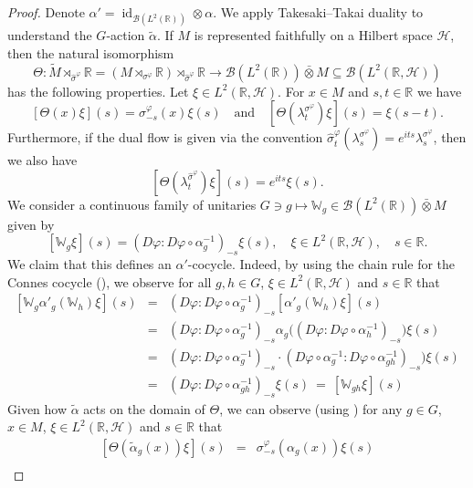 \documentclass[11pt,a4paper]{article}
\theoremstyle{definition}
\theoremstyle{remark}
\numberwithin{equation}{section}
\numberwithin{theorem}{section}
\newcommand{\R}{\mathbb{R}}
\renewcommand{\tilde}{\widetilde}
\begin{document}
\begin{proof}
Denote $\alpha'=\operatorname{id}_{\mathcal{B}(L^2(\mathbb R))}\otimes\alpha$.
We apply Takesaki--Takai duality \cite[Chapter X, Theorem 2.3(iii)]{Takesaki03} to understand the $G$-action $\tilde{\alpha}$.
If $M$ is represented faithfully on a Hilbert space $\mathcal H$, then the natural isomorphism 
\[
\Theta: \tilde{M}\rtimes_{\hat{\sigma}^\varphi}\mathbb R = (M\rtimes_{\sigma^\varphi}\mathbb R)\rtimes_{\hat{\sigma}^\varphi}\mathbb R \to \mathcal{B}(L^2(\mathbb R)) \bar{\otimes} M\subseteq \mathcal{B}(L^2(\mathbb R,\mathcal H))
\]
has the following properties.
Let $\xi\in L^2(\mathbb R,\mathcal H)$.
For $x\in M$ and $s,t\in\mathbb R$ we have
\[
[\Theta(x)\xi ](s) = \sigma^\varphi_{-s}(x)\xi(s) \quad\text{and}\quad [\Theta(\lambda^{\sigma^\varphi}_t)\xi](s) = \xi(s-t).
\]
Furthermore, if the dual flow is given via the convention 
$\hat{\sigma}^\varphi_t(\lambda_s^{\sigma^{\varphi}}) = e^{its}\lambda^{\sigma^{\varphi}}_s$, then we also have
\[
[\Theta(\lambda^{\hat{\sigma}^\varphi}_t)\xi](s)=e^{its}\xi(s).
\]
We consider a continuous family of unitaries $G\ni g\mapsto \mathbb{W}_g\in \mathcal{B}(L^2(\mathbb R)) \bar{\otimes} M$ given by
\[
[\mathbb{W}_g\xi](s) = (D\varphi: D\varphi\circ\alpha_g^{-1})_{-s}\xi(s),\quad \xi\in L^2(\mathbb R,\mathcal H),\quad s\in\mathbb R.
\]
We claim that this defines an $\alpha'$-cocycle.
Indeed, by using the chain rule for the Connes cocycle (\cite[Theorem VIII.3.7]{Takesaki03}), we observe for all $g,h\in G$, $\xi\in L^2(\mathbb R,\mathcal H)$ and $s\in\mathbb R$ that
\[
\begin{array}{ccl}
[\mathbb{W}_g\alpha'_g(\mathbb W_h)\xi](s) &=& (D\varphi: D\varphi\circ\alpha_g^{-1})_{-s}[\alpha'_g(\mathbb W_h)\xi](s) \\
&=& (D\varphi: D\varphi\circ\alpha_g^{-1})_{-s}\alpha_g\big( (D\varphi: D\varphi\circ\alpha_h^{-1})_{-s} \big)\xi(s) \\
&=& (D\varphi: D\varphi\circ\alpha_g^{-1})_{-s}\cdot (D\varphi\circ\alpha_g^{-1}: D\varphi\circ\alpha_{gh}^{-1})_{-s} \big)\xi(s) \\
&=& (D\varphi: D\varphi\circ\alpha_{gh}^{-1})_{-s}\xi(s) \ = \ [\mathbb{W}_{gh}\xi](s)
\end{array}
\]
Given how $\tilde{\alpha}$ acts on the domain of $\Theta$, we can observe (using \cite[Corollary VIII.1.4]{Takesaki03}) for any $g\in G$, $x \in M$, $\xi \in L^2(\R, \mathcal{H})$ and $s \in \R$ that
\[
\begin{array}{ccl}
[\Theta(\tilde{\alpha}_g(x))\xi ](s) &=& \sigma^\varphi_{-s}(\alpha_g(x))\xi(s) \\

\end{array}\]
\end{proof}
\end{document}
